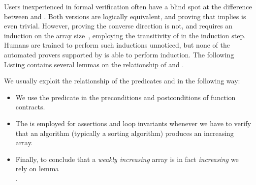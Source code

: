 

Users inexperienced in formal verification often have a blind spot at the
difference between \Increasing and \WeaklyIncreasing.
%
Both versions are logically equivalent,
and proving that \Increasing implies \WeaklyIncreasing is even trivial.
%
However, proving the converse direction is not, and requires an induction on the
array size~, employing the transitivity of \inl{<=} in the induction step.
%
Humans are trained to perform such inductions unnoticed,
but none of the automated provers supported by \framac is able to perform induction.
%
The following Listing contains several lemmas on the relationship of
\WeaklyIncreasing and \Increasing.



\clearpage

We usually exploit the relationship of the predicates \Increasing and \WeaklyIncreasing
in the following way:

\begin{itemize}
\item We use the predicate \Increasing in the preconditions and postconditions of
      function contracts.
\item The \WeaklyIncreasing is employed for assertions and loop invariants
      whenever we have to verify that an algorithm (typically a sorting algorithm)
      produces an increasing array.
\item Finally, to conclude that a \emph{weakly increasing} array is in fact \emph{increasing}
      we rely on lemma\\
       .
\end{itemize}

\clearpage






